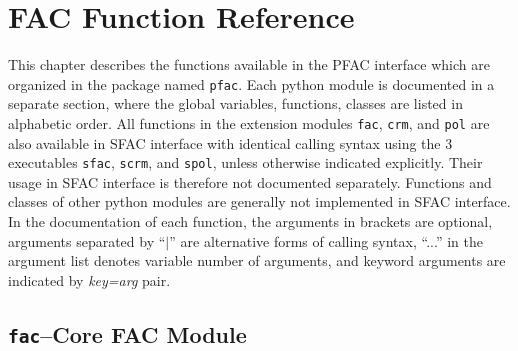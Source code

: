 \documentclass[twoside,letterpaper]{refrep}
\newcommand{\var}[1]{\textit{#1}}
\newcommand{\mod}[1]{\texttt{#1}}
\begin{document}
\chapter{FAC Function Reference}
\label{cha:function}
This chapter describes the functions available in the PFAC interface which are
organized in the package named \mod{pfac}. Each
python module is documented in a separate section, where the global variables,
functions, classes are listed in alphabetic order. All functions in the
extension modules \mod{fac}, \mod{crm}, and \mod{pol} are also available in
SFAC interface with identical calling syntax using the 3 executables
\mod{sfac}, \mod{scrm}, and \mod{spol}, unless otherwise indicated
explicitly. Their usage in SFAC 
interface is therefore not documented separately. Functions and classes of
other python modules are generally not implemented in SFAC interface. In the
documentation of each function, the arguments in brackets are optional,
arguments separated by ``$\mid$'' are alternative forms of calling syntax,
``...'' in the argument list denotes variable number of arguments, and
keyword arguments are indicated by \var{key=arg} pair.

\section{\mod{fac}--Core FAC Module}
\label{sec:fac}
\end{document}
